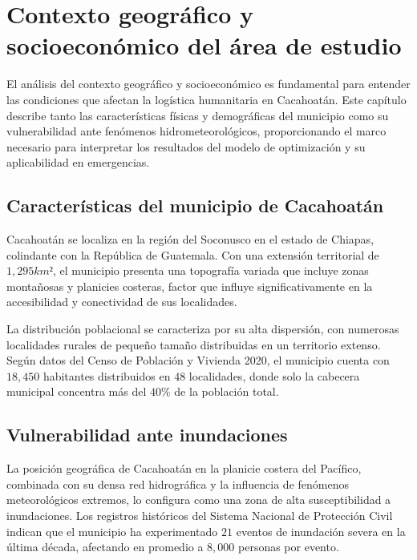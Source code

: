 \documentclass[
  spanish,
  us-letterpaper,
]{scrreprt}
\numberwithin{equation}{section}
\begin{document}
\section{Contexto geográfico y socioeconómico del área de
estudio}\label{contexto-geogruxe1fico-y-socioeconuxf3mico-del-uxe1rea-de-estudio}

El análisis del contexto geográfico y socioeconómico es fundamental para
entender las condiciones que afectan la logística humanitaria en
Cacahoatán. Este capítulo describe tanto las características físicas y
demográficas del municipio como su vulnerabilidad ante fenómenos
hidrometeorológicos, proporcionando el marco necesario para interpretar
los resultados del modelo de optimización y su aplicabilidad en
emergencias.

\subsection{Características del municipio de
Cacahoatán}\label{caracteruxedsticas-del-municipio-de-cacahoatuxe1n}

Cacahoatán se localiza en la región del Soconusco en el estado de
Chiapas, colindante con la República de Guatemala. Con una extensión
territorial de \(1,295 km²\), el municipio presenta una topografía
variada que incluye zonas montañosas y planicies costeras, factor que
influye significativamente en la accesibilidad y conectividad de sus
localidades.

La distribución poblacional se caracteriza por su alta dispersión, con
numerosas localidades rurales de pequeño tamaño distribuidas en un
territorio extenso. Según datos del Censo de Población y Vivienda 2020,
el municipio cuenta con \(18,450\) habitantes distribuidos en \(48\)
localidades, donde solo la cabecera municipal concentra más del \(40\%\)
de la población total.

\subsection{Vulnerabilidad ante
inundaciones}\label{vulnerabilidad-ante-inundaciones}

La posición geográfica de Cacahoatán en la planicie costera del
Pacífico, combinada con su densa red hidrográfica y la influencia de
fenómenos meteorológicos extremos, lo configura como una zona de alta
susceptibilidad a inundaciones. Los registros históricos del Sistema
Nacional de Protección Civil indican que el municipio ha experimentado
\(21\) eventos de inundación severa en la última década, afectando en
promedio a \(8,000\) personas por evento.
\end{document}
